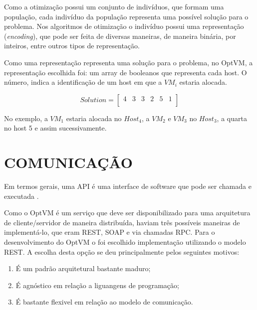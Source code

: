 Como a otimização possui um conjunto de indivíduos, que formam uma população, cada indivíduo
da população representa uma possível solução para o problema.  Nos algoritmos de 
otimização o indivíduo possui uma representação (\textit{encoding}), que pode ser feita
de diversas maneiras, de maneira binária, por inteiros, entre outros tipos de representação.

Como uma representação representa uma solução para o problema, no OptVM, a 
representação escolhida foi: um array de booleanos que representa cada host.
O número, indica a identificação
de um host em que a \begin{math}VM_{i}\end{math} estaria alocada.

\[
  Solution=
  \left[{\begin{array}{cccccc}
    4 & 3 & 3 & 2 & 5 & 1 \\
  \end{array}}\right
  ]  
\]

No exemplo, a \begin{math}VM_{1}\end{math} estaria alocada no \begin{math}Host_{4}\end{math}, a 
\begin{math}VM_{2}\end{math} e \begin{math}VM_{3}\end{math} no \begin{math}Host_{3}\end{math},
a quarta no host 5 e assim sucessivamente.

\section{COMUNICAÇÃO}
Em termos gerais, uma API é uma interface de software que pode ser chamada e executada \cite{eizinger}. 

Como o OptVM é um serviço que deve ser disponibilizado para uma arquitetura de 
cliente/servidor de maneira distribuída, haviam três possíveis maneiras de implementá-lo, 
que eram REST, SOAP e via chamadas RPC. 
Para o desenvolvimento do OptVM o foi escolhido implementação utilizando o modelo REST. 
A escolha desta opção se deu principalmente pelos seguintes motivos:

\begin{enumerate}
\item É um padrão arquitetural bastante maduro;
\item É agnóstico em relação a liguangens de programação;
\item É bastante flexivel em relação ao modelo de comunicação.
\end{enumerate}

